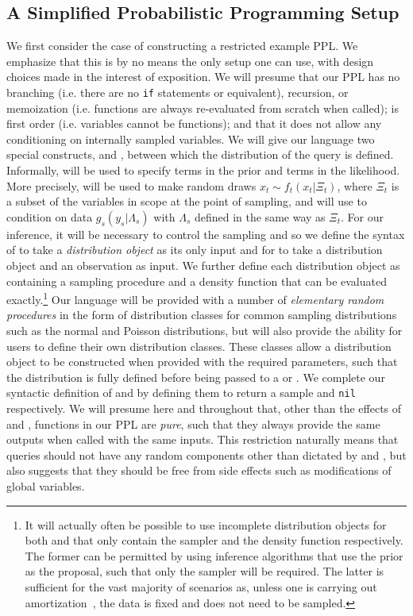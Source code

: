 \subsection{A Simplified Probabilistic Programming Setup}
\label{sec:probprog:models:first}

We first consider the case of constructing a restricted example PPL.  We emphasize that
this is by no means the only setup one can use, with design choices made in the interest of exposition.
We will presume that our PPL
has no branching (i.e. there are no \texttt{if} statements or equivalent), recursion, or memoization
(i.e. functions are always re-evaluated from scratch when called); is first order
(i.e. variables cannot be functions); and that it does not allow 
any conditioning on internally sampled variables.  
We will give our language
two special constructs, \sample and \observe, between which the distribution of the
query is defined. 
Informally, \sample will be used to specify terms in the prior and \observe terms in the
likelihood.  More precisely, \sample will be used to make random draws $x_t \sim f_t(x_t | \Xi_t)$,
where $\Xi_t$ is a subset of the variables in scope at the point of sampling, and \observe will use to condition on
data $g_s(y_s|\Lambda_s)$ with $\Lambda_s$ defined in the same way as $\Xi_t$.  
For our inference, it will be necessary to control the sampling and so we define
the syntax of \sample to take a \emph{distribution object} as its only input and for \observe
to take a distribution object and an observation as input.  We further define each distribution
object as containing a sampling procedure and a density function that can be evaluated
exactly.\footnote{It will actually often be possible to use incomplete distribution objects for
	both \sample and \observe that only contain the sampler and the density function respectively.
	The former can be permitted by using inference algorithms that use the prior as the proposal, such
	that only the sampler will be required.  The latter is sufficient for the vast majority of scenarios as, unless
	one is carrying out amortization~\citep{paige2016inference,le2017inference}, the data is fixed and does
	not need to be sampled.}  Our language will be provided with a number of \emph{elementary random
	procedures} in
the form of distribution classes for common sampling distributions such as the normal and Poisson
distributions, but will also provide the ability for users to define their own distribution classes.   These
classes allow a distribution object to be constructed when provided with the required parameters, such that
the distribution is fully defined before being passed to a \sample or \observe.
We complete our syntactic definition of \sample and \observe by defining them to return a sample and \texttt{nil}
respectively.
 We will presume here and throughout that, other than the effects of \sample and \observe,
 functions in our PPL are \emph{pure}, such that they always provide the same outputs when
 called with the same inputs.  This restriction naturally means that queries should not have
 any random components other than dictated by \sample and \observe, but also suggests that
 they should be free from side effects such as modifications of global variables.

